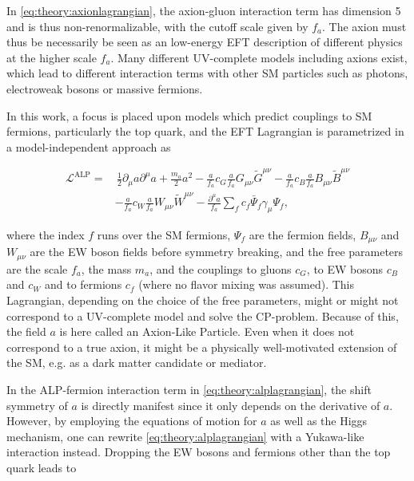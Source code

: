 In \cref{eq:theory:axionlagrangian}, the axion-gluon interaction term has dimension 5 and is thus non-renormalizable, with the cutoff scale given by $f_a$. The axion must thus be necessarily be seen as an low-energy EFT description of different physics at the higher scale $f_a$. Many different UV-complete models including axions exist, which lead to different interaction terms with other SM particles such as photons, electroweak bosons or massive fermions.

In this work, a focus is placed upon models which predict couplings to SM fermions, particularly the top quark, and the EFT Lagrangian is parametrized in a model-independent approach as~\cite{Georgi:1986df}

\begin{equation}
\begin{split}
\label{eq:theory:alplagrangian}
    \mathcal{L}^{\mathrm{ALP}} =& \, \frac{1}{2} \partial_\mu a \partial^\mu a
    + \frac{m_a}{2} a^2
    - \frac{a}{f_a} c_G \frac{a}{f_a} G_{\mu \nu} \tilde{G}^{\mu \nu}
    - \frac{a}{f_a} c_B \frac{a}{f_a} B_{\mu \nu} \tilde{B}^{\mu \nu} \\
    & - \frac{a}{f_a} c_W \frac{a}{f_a} W_{\mu \nu} \tilde{W}^{\mu \nu}
    - \frac{\partial^\mu a}{f_a} \sum_f c_f \bar{\Psi}_f \gamma_\mu \Psi_f ,
\end{split}
\end{equation}

\noindent where the index $f$ runs over the SM fermions, $\Psi_f$ are the fermion fields, $B_{\mu \nu}$ and $W_{\mu \nu}$ are the EW boson fields before symmetry breaking, and the free parameters are the scale $f_a$, the mass $m_a$, and the couplings to gluons $c_G$, to EW bosons $c_B$ and $c_W$ and to fermions $c_f$ (where no flavor mixing was assumed). This Lagrangian, depending on the choice of the free parameters, might or might not correspond to a UV-complete model and solve the CP-problem. Because of this, the field $a$ is here called an Axion-Like Particle. Even when it does not correspond to a true axion, it might be a physically well-motivated extension of the SM, e.g. as a dark matter candidate or mediator.

In the ALP-fermion interaction term in \cref{eq:theory:alplagrangian}, the shift symmetry of $a$ is directly manifest since it only depends on the derivative of $a$. However, by employing the equations of motion for $a$ as well as the Higgs mechanism, one can rewrite \cref{eq:theory:alplagrangian} with a Yukawa-like interaction instead. Dropping the EW bosons and fermions other than the top quark leads to

